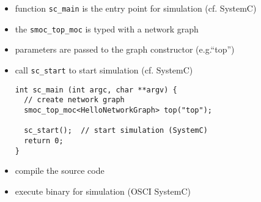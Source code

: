 \begin{frame}[fragile=singleslide]
\begin{itemize}
\item function \lstinline!sc_main! is the entry point for simulation (cf. SystemC)
\item the \lstinline!smoc_top_moc! is typed with a network graph
\item parameters are passed to the graph constructor (e.g.``top'')
\item call \lstinline!sc_start! to start simulation (cf. SystemC)
\begin{lstlisting}
int sc_main (int argc, char **argv) {
  // create network graph
  smoc_top_moc<HelloNetworkGraph> top("top");

  sc_start();  // start simulation (SystemC)
  return 0;
}
\end{lstlisting}
\item compile the source code
\item execute binary for simulation (OSCI SystemC)
\end{itemize}
\end{frame}
